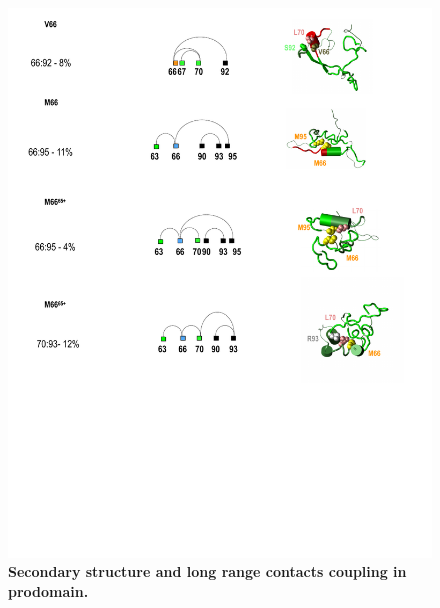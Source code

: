 \documentclass[journal=jacsat,manuscript=article]{achemso}
\begin{document}







\begin{figure}[!ht]
\includegraphics[scale=0.5,width=12cm,trim={0 0cm 0 0cm},clip]{../figures/n3.pdf}
\caption{{\bf Secondary structure and long range contacts coupling in prodomain.}
 }
\label{fig6}
\end{figure}
\end{document}
